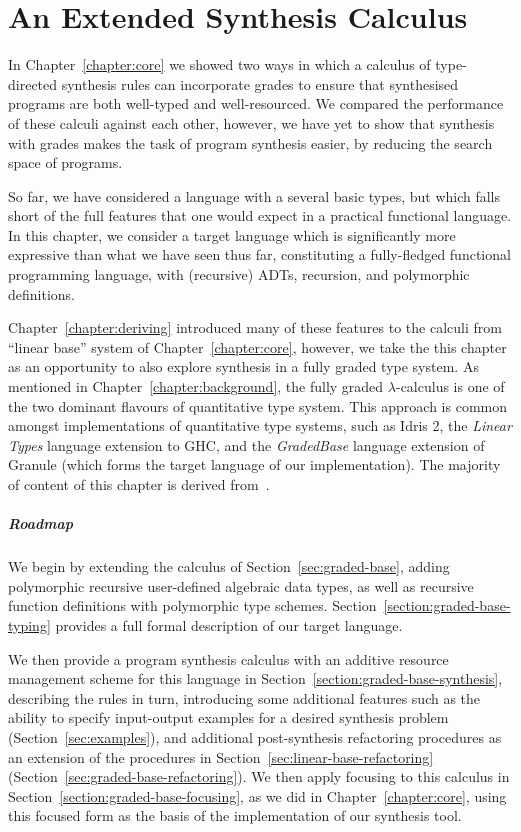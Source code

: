\chapter{An Extended Synthesis Calculus}
\label{chapter:extended}
In Chapter~\ref{chapter:core} we showed two ways in which a calculus of
type-directed synthesis rules can incorporate grades to ensure that synthesised
programs are both well-typed and well-resourced. We compared the performance of
these calculi against each other, however, we have yet to show that synthesis
with grades makes the task of program synthesis easier, by reducing the search
space of programs. 

So far, we have considered a language with a several basic types, but which
falls short of the full features that one would expect in a practical functional
language. In this chapter, we consider a target language which is significantly
more expressive than what we have seen thus far, constituting a fully-fledged
functional programming language, with (recursive) ADTs, recursion, and 
polymorphic definitions. 

Chapter~\ref{chapter:deriving} introduced many of these features to the calculi
from ``linear base'' system of Chapter~\ref{chapter:core}, however, we take the
this chapter as an opportunity to also explore synthesis in a fully graded type
system. As mentioned in Chapter~\ref{chapter:background}, the fully graded
$\lambda$-calculus is one of the two dominant flavours of quantitative type
system. This approach is common amongst implementations of quantitative type
systems, such as Idris 2, the \emph{Linear Types} language extension to GHC, and
the \emph{GradedBase} language extension of Granule (which forms the target
language of our implementation). The majority of content of this chapter is 
derived from~\citet{esop-synthesis}.

\paragraph{Roadmap}
We begin by extending the calculus of Section~\ref{sec:graded-base}, adding
polymorphic recursive user-defined algebraic data types, as well as recursive
function definitions with polymorphic type schemes.
Section~\ref{section:graded-base-typing} provides a full formal description of
our target language.

We then provide a program synthesis calculus with an additive resource
management scheme for this language in
Section~\ref{section:graded-base-synthesis}, describing the rules in turn,
introducing some additional features such as the ability to specify input-output
examples for a desired synthesis problem (Section~\ref{sec:examples}), and
additional post-synthesis refactoring procedures as an extension of the
procedures in Section~\ref{sec:linear-base-refactoring}
(Section~\ref{sec:graded-base-refactoring}). We then apply focusing to this
calculus in Section~\ref{section:graded-base-focusing}, as we did in
Chapter~\ref{chapter:core}, using this focused form as the basis of the
implementation of our synthesis tool.

